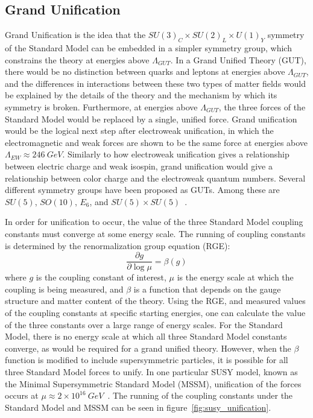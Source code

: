 \subsection{Grand Unification}\label{subsec:susy_unification}

Grand Unification is the idea that the $SU(3)_C \times SU(2)_L \times U(1)_Y$ symmetry of the Standard Model can be embedded in a simpler symmetry group, which constrains the theory at energies above $\Lambda_{GUT}$.
In a Grand Unified Theory (GUT), there would be no distinction between quarks and leptons at energies above $\Lambda_{GUT}$, and the differences in interactions between these two types of matter fields would be explained by the details of the theory and the mechanism by which its symmetry is broken.
Furthermore, at energies above $\Lambda_{GUT}$, the three forces of the Standard Model would be replaced by a single, unified force.
Grand unification would be the logical next step after electroweak unification, in which the electromagnetic and weak forces are shown to be the same force at energies above $\Lambda_{EW}\approx 246~GeV$.
Similarly to how electroweak unification gives a relationship between electric charge and weak isospin, grand unification would give a relationship between color charge and the electroweak quantum numbers.
Several different symmetry groups have been proposed as GUTs.
Among these are $SU(5)$, $SO(10)$, $E_6$, and $SU(5)\times SU(5)$~\cite{susy-unification-1998}.

In order for unification to occur, the value of the three Standard Model coupling constants must converge at some energy scale.
The running of coupling constants is determined by the renormalization group equation (RGE):
\begin{equation}\label{eq:renorm_group}
    \frac{\partial g}{\partial \log \mu} = \beta(g)
\end{equation}
where $g$ is the coupling constant of interest, $\mu$ is the energy scale at which the coupling is being measured, and $\beta$ is a function that depends on the gauge structure and matter content of the theory.
Using the RGE, and measured values of the coupling constants at specific starting energies,
one can calculate the value of the three constants over a large range of energy scales.
For the Standard Model, there is no energy scale at which all three Standard Model constants converge, as would be required for a grand unified theory.
However, when the $\beta$ function is modified to include supersymmetric particles, it is possible for all three Standard Model forces to unify.
In one particular SUSY model, known as the Minimal Supersymmetric Standard Model (MSSM), unification of the forces occurs at $\mu \approx 2\times10^{16}~GeV$~\cite{susy-unification-1998}.
The running of the coupling constants under the Standard Model and MSSM can be seen in figure~\ref{fig:susy_unification}.

